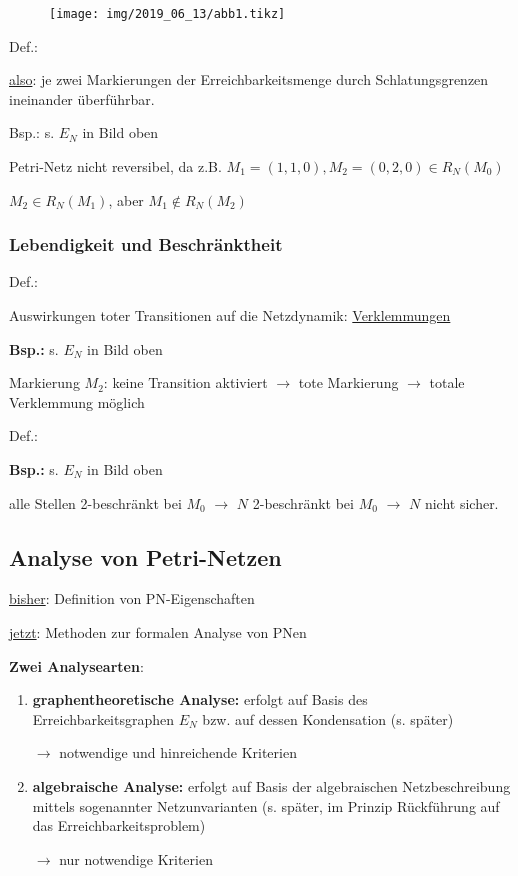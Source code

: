 
	\begin{figure}[H]
		\centering
		\texttt{[image: img/2019\_06\_13/abb1.tikz]}
	\end{figure}
	
Def.:  

\underline{also}: je zwei Markierungen der Erreichbarkeitsmenge durch Schlatungsgrenzen ineinander überführbar.

Bsp.: s. $E_N$ in Bild oben

Petri-Netz nicht reversibel, da z.B. $M_1 = (1,1,0), M_2 = (0,2,0) \in R_N(M_0)$

$M_2 \in R_N(M_1)$, aber $M_1\notin R_N(M_2)$ 

\subsubsection{Lebendigkeit und Beschränktheit}
Def.: 

Auswirkungen toter Transitionen auf die Netzdynamik: \underline{Verklemmungen} 

\textbf{Bsp.:} s. $E_N$ in Bild oben

Markierung $M_2$: keine Transition aktiviert $\rightarrow$ tote Markierung $\rightarrow$ totale Verklemmung möglich

Def.: 

\textbf{Bsp.:} s. $E_N$ in Bild oben

alle Stellen 2-beschränkt bei $M_0$ $\rightarrow$ $N$ 2-beschränkt bei $M_0$ $\rightarrow$ $N$ nicht sicher. 

\subsection{Analyse von Petri-Netzen}
\underline{bisher}: Definition von PN-Eigenschaften

\underline{jetzt}: Methoden zur formalen Analyse von PNen

\textbf{Zwei Analysearten}:

\begin{enumerate}
	\item{\textbf{graphentheoretische Analyse:}} erfolgt auf Basis des Erreichbarkeitsgraphen $E_N$ bzw. auf dessen Kondensation (s. später) 
	
	$\rightarrow$ notwendige und hinreichende Kriterien
	
	\item{\textbf{algebraische Analyse:}} erfolgt auf Basis der algebraischen Netzbeschreibung mittels sogenannter Netzunvarianten (s. später, im Prinzip Rückführung auf das Erreichbarkeitsproblem)
	
	$\rightarrow$ nur notwendige Kriterien
\end{enumerate}

